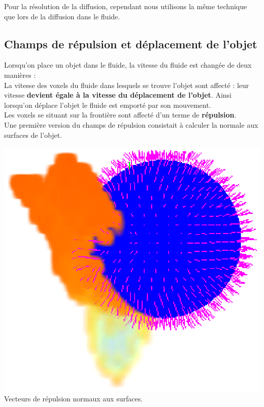 \documentclass[a4paper,10pt]{article}
\begin{document}
Pour la résolution de la diffusion, cependant nous utilisons la même
technique que lors de la diffusion dans le fluide.

\subsection{Champs de répulsion et déplacement de l'objet}

Lorsqu'on place un objet dans le fluide, la vitesse du fluide est
changée de deux manières :\\ La vitesse des voxels du fluide dans
lesquels se trouve l'objet sont affecté : leur vitesse \textbf{devient
  égale à la vitesse du déplacement de l'objet}. Ainsi lorsqu'on
déplace l'objet le fluide est emporté par son mouvement.\\ Les voxels
se situant sur la frontière sont affecté d'un terme de
\textbf{répulsion}. \\

Une première version du champs de répulsion consistait à calculer la normale aux surfaces de l'objet.\\
    
\begin{center}
  \includegraphics[scale=0.7]{Contour.ps}\\
  Vecteurs de répulsion normaux aux surfaces.
\end{center}
    
\end{document}
